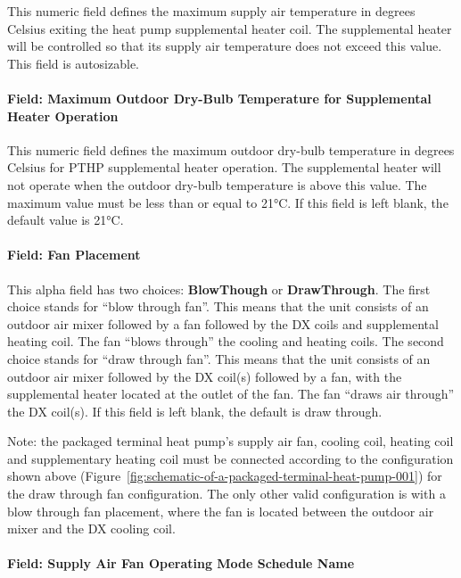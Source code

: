This numeric field defines the maximum supply air temperature in degrees Celsius exiting the heat pump supplemental heater coil. The supplemental heater will be controlled so that its supply air temperature does not exceed this value. This field is autosizable.

\paragraph{Field: Maximum Outdoor Dry-Bulb Temperature for Supplemental Heater Operation}\label{field-maximum-outdoor-dry-bulb-temperature-for-supplemental-heater-operation-000}

This numeric field defines the maximum outdoor dry-bulb temperature in degrees Celsius for PTHP supplemental heater operation. The supplemental heater will not operate when the outdoor dry-bulb temperature is above this value. The maximum value must be less than or equal to 21°\si{C}. If this field is left blank, the default value is 21°\si{C}.

\paragraph{Field: Fan Placement}\label{field-fan-placement-4-000}

This alpha field has two choices: \textbf{BlowThough} or \textbf{DrawThrough}. The first choice stands for ``blow through fan''. This means that the unit consists of an outdoor air mixer followed by a fan followed by the DX coils and supplemental heating coil. The fan ``blows through'' the cooling and heating coils. The second choice stands for ``draw through fan''. This means that the unit consists of an outdoor air mixer followed by the DX coil(s) followed by a fan, with the supplemental heater located at the outlet of the fan. The fan ``draws air through'' the DX coil(s). If this field is left blank, the default is draw through.

Note: the packaged terminal heat pump's supply air fan, cooling coil, heating coil and supplementary heating coil must be connected according to the configuration shown above (Figure~\ref{fig:schematic-of-a-packaged-terminal-heat-pump-001}) for the draw through fan configuration. The only other valid configuration is with a blow through fan placement, where the fan is located between the outdoor air mixer and the DX cooling coil.

\paragraph{Field: Supply Air Fan Operating Mode Schedule Name}\label{field-supply-air-fan-operating-mode-schedule-name-5}

